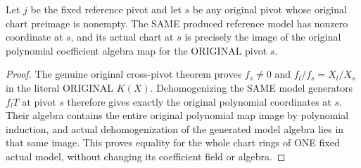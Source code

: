 \begin{theorem}
\label{thm:seven-original-fixed-model-all-chart-images-route}
\leanok
{}
Let $j$ be the fixed reference pivot and let $s$ be any original pivot
whose original chart preimage is nonempty. The SAME produced reference
model has nonzero coordinate at $s$, and its actual chart at $s$ is
precisely the image of the original polynomial coefficient algebra map
for the ORIGINAL pivot $s$.
\end{theorem}
\begin{proof}
The genuine original cross-pivot theorem proves $f_s\ne0$ and
$f_l/f_s=X_l/X_s$ in the literal ORIGINAL $K(X)$. Dehomogenizing the
SAME model generators $f_lT$ at pivot $s$ therefore gives exactly the
original polynomial coordinates at $s$. Their algebra contains the
entire original polynomial map image by polynomial induction, and
actual dehomogenization of the generated model algebra lies in that
same image. This proves equality for the whole chart rings of ONE
fixed actual model, without changing its coefficient field or algebra.
\end{proof}

